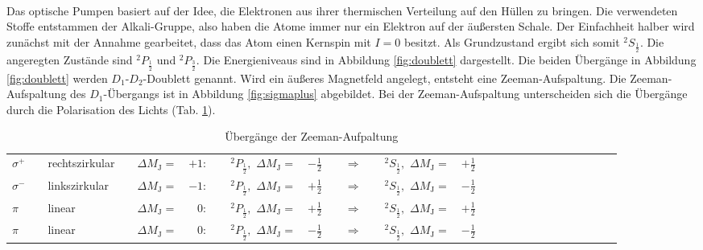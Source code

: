 %
\\Das optische Pumpen basiert auf der Idee, die Elektronen aus ihrer thermischen Verteilung auf den Hüllen zu bringen.
Die verwendeten Stoffe entstammen der Alkali-Gruppe, also haben die Atome immer nur ein Elektron auf der äußersten Schale.
Der Einfachheit halber wird zunächst mit der Annahme gearbeitet, dass das Atom einen Kernspin mit $I=0$ besitzt.
Als Grundzustand ergibt sich somit $^{2}S_{\frac{1}{2}}$.
Die angeregten Zustände sind $^{2}P_{\frac{1}{2}}$ und $^{2}P_{\frac{3}{2}}$.
Die Energieniveaus sind in Abbildung \ref{fig:doublett} dargestellt.
Die beiden Übergänge in Abbildung \ref{fig:doublett} werden $D_{1}$-$D_{2}$-Doublett genannt.
Wird ein äußeres Magnetfeld angelegt, entsteht eine Zeeman-Aufspaltung.
Die Zeeman-Aufspaltung des $D_{1}$-Übergangs ist in Abbildung \ref{fig:sigmaplus} abgebildet.
Bei der Zeeman-Aufspaltung unterscheiden sich die Übergänge durch die Polarisation des Lichts (Tab. \ref{tab:polarisation}).
\begin{table}[h!]
  \centering
  \caption{Übergänge der Zeeman-Aufpaltung}
  \label{tab:polarisation}
  \begin{tabular}{l l l l l r l l r l c l l r l l l l l l l l l l l l}
    \toprule
$\sigma^{+}$ && rechtszirkular && $\Delta M_{\text{J}}=$ & $+1:$  &&  $^{2}P_{\frac{1}{2}},$ $\Delta M_{\text{J}}=$ & $-\frac{1}{2}$ &&$\Rightarrow$&& $^{2}S_{\frac{1}{2}},$ $\Delta M_{\text{J}}=$ & $+\frac{1}{2}$ \\
$\sigma^{-}$ && linkszirkular  && $\Delta M_{\text{J}}=$ & $-1:$  &&  $^{2}P_{\frac{1}{2}},$ $\Delta M_{\text{J}}=$ & $+\frac{1}{2}$  &&$\Rightarrow$&& $^{2}S_{\frac{1}{2}},$ $\Delta M_{\text{J}}=$ & $-\frac{1}{2}$ \\
$\pi       $ && linear         && $\Delta M_{\text{J}}=$ & $ 0:$  &&  $^{2}P_{\frac{1}{2}},$ $\Delta M_{\text{J}}=$ & $+\frac{1}{2}$  &&$\Rightarrow$&& $^{2}S_{\frac{1}{2}},$ $\Delta M_{\text{J}}=$ & $+\frac{1}{2}$ \\
$\pi$        && linear         && $\Delta M_{\text{J}}=$ & $ 0:$  &&  $^{2}P_{\frac{1}{2}},$ $\Delta M_{\text{J}}=$ & $-\frac{1}{2}$ &&$\Rightarrow$&& $^{2}S_{\frac{1}{2}},$ $\Delta M_{\text{J}}=$ & $-\frac{1}{2}$ \\
    \bottomrule
  \end{tabular}
\end{table}
